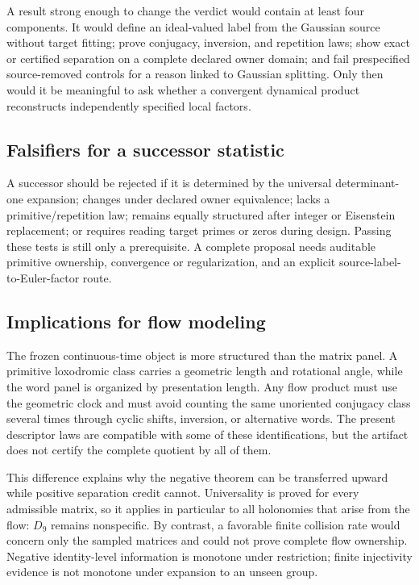 \documentclass[11pt,a4paper]{article}
\theoremstyle{definition}
\theoremstyle{remark}
\begin{document}
A result strong enough to change the verdict would contain at least four components. It would define an ideal-valued label from the Gaussian source without target fitting; prove conjugacy, inversion, and repetition laws; show exact or certified separation on a complete declared owner domain; and fail prespecified source-removed controls for a reason linked to Gaussian splitting. Only then would it be meaningful to ask whether a convergent dynamical product reconstructs independently specified local factors.

\subsection{Falsifiers for a successor statistic}

A successor should be rejected if it is determined by the universal determinant-one expansion; changes under declared owner equivalence; lacks a primitive/repetition law; remains equally structured after integer or Eisenstein replacement; or requires reading target primes or zeros during design. Passing these tests is still only a prerequisite. A complete proposal needs auditable primitive ownership, convergence or regularization, and an explicit source-label-to-Euler-factor route.

\subsection{Implications for flow modeling}

The frozen continuous-time object is more structured than the matrix panel. A primitive loxodromic class carries a geometric length and rotational angle, while the word panel is organized by presentation length. Any flow product must use the geometric clock and must avoid counting the same unoriented conjugacy class several times through cyclic shifts, inversion, or alternative words. The present descriptor laws are compatible with some of these identifications, but the artifact does not certify the complete quotient by all of them.

This difference explains why the negative theorem can be transferred upward while positive separation credit cannot. Universality is proved for every admissible matrix, so it applies in particular to all holonomies that arise from the flow: \(D_9\) remains nonspecific. By contrast, a favorable finite collision rate would concern only the sampled matrices and could not prove complete flow ownership. Negative identity-level information is monotone under restriction; finite injectivity evidence is not monotone under expansion to an unseen group.
\end{document}

